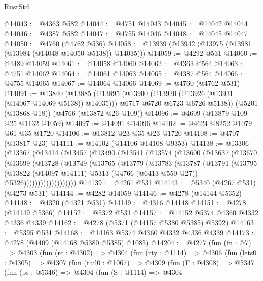 \begin{lexlean}{RustStd}
\begin{coremodule}
{\begin{coremodule}
{{{{{{{{{{{{{{{{{{{{{{{{{{{{{{{{{{{@14043 := @4363 @582
@14044 := @4751 @14043
@14045 := @14042 @14044
@14046 := @4387 @582
@14047 := @4755 @14046
@14048 := @14045 @14047
@14050 := @4760 (@4762 @536)
@14058 := @13939 (@13942 (@13975 (@13981 (@13984 (@14048 @14050 @5138)) @14035)))
@14059 := @4292 @531
@14060 := @4489 @14059
@14061 := @14058 @14060
@14062 := @4363 @564
@14063 := @4751 @14062
@14064 := @14061 @14063
@14065 := @4387 @564
@14066 := @4755 @14065
@14067 := @14064 @14066
@14069 := @4760 (@4762 @531)
@14091 := @13840
    (@13885
      (@13895
        (@13900 (@13920 (@13926 (@13931 (@14067 @14069 @5138)) @14035)))
        @6717
        @6720
        @6723
        @6726
        @5138))
    (@5201 (@13868 @18))
    (@4766 (@13872 @26 @109))
@14096 := @4609 (@13879 @109 @25 @1132 @1059)
@14097 := @14091 @14096
@14102 := @4624 @8252 @1079 @61 @35 @1720
@14106 := @13812 @23 @35 @23 @1720
@14108 := @4707 (@13817 @23)
@14111 := @14102 (@14106 @14108 @9353)
@14138 := @13306
    (@13367
      (@13414
        (@13457
          (@13490
            (@13541
              (@13574
                (@13600
                  (@13637
                    (@13670
                      (@13699
                        (@13728
                          (@13749
                            (@13765
                              (@13779
                                (@13783
                                  (@13787
                                    (@13791
                                      (@13795
                                        (@13822
                                          (@14097 @14111)
                                          @5313
                                          (@4766 (@6413 @550 @27))
                                          @5326)))))))))))))))))))
@14139 := @4261 @531
@14143 := @5340 (@4267 @531) (@4273 @531)
@14144 := @4282 @14059
@14146 := @4278 (@14144 @5352)
@14148 := @4320 (@4321 @531)
@14149 := @4316 @14148
@14151 := @4278 (@14149 @5366)
@14152 := @5372 @531
@14157 := @14152 @5374 @4360 @4332 @4336 @4339
@14162 := @4278 (@5371 (@14157 @5380 @5385) @5392)
@14163 := @5395 @531
@14168 := @14163 @5374 @4360 @4332 @4336 @4339
@14173 := @4278 (@4409 (@14168 @5380 @5385) @1085)
@14204 := @4277
    (fun (fn : @7) =>
    @4303
      (fun (rc : @4302) =>
      @4304
        (fun (rty : @1114) =>
        @4306
          (fun (lets0 : @4305) =>
          @4307
            (fun (tail0 : @1067) =>
            @4309
              (fun (Γ : @4308) =>
              @5347
                (fun (ps : @5346) =>
                @4304
                  (fun (S : @1114) =>
                  @4304
}}}}}}}}}}}}}}}}}}}}}}}}}}}}}}}}}}}
\end{coremodule}}
\end{coremodule}
\end{lexlean}
